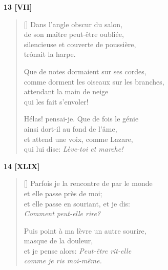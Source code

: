 \documentclass[a4paper,12pt]{book}
\begin{document}
\bigskip

\begin{center}
  \textbf{13 [VII]}
\end{center}

\settowidth{\versewidth}{comme dorment les oiseaux sur les branches,}

\begin{verse}[\versewidth]
  Dans l'angle obscur du salon, \\
  de son maître peut-être oubliée, \\
  silencieuse et couverte de poussière, \\
  trônait la harpe.

  Que de notes dormaient sur ses cordes, \\
  comme dorment les oiseaux sur les branches, \\
  attendant la main de neige \\
  qui les fait s'envoler!

  Hélas! pensai-je. Que de fois le génie \\
  ainsi dort-il au fond de l'âme, \\
  et attend une voix, comme Lazare, \\
  qui lui dise: \emph{Lève-toi et marche!}
\end{verse}

\bigskip

\begin{center}
  \textbf{14 [XLIX]}
\end{center}

\settowidth{\versewidth}{Puis point à ma lèvre un autre sourire,}

\begin{verse}[\versewidth]
  Parfois je la rencontre de par le monde \\
  et elle passe près de moi; \\
  et elle passe en souriant, et je dis: \\
  \emph{Comment peut-elle \emph{rire}?}

  Puis point à ma lèvre un autre sourire, \\
  masque de la douleur, \\
  et je pense alors: \emph{Peut-être rit-elle \\
  comme je ris moi-même.}
\end{verse}
\end{document}
